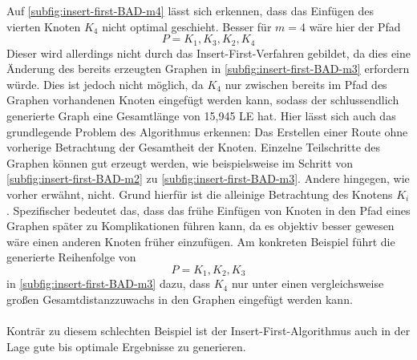 Auf \vref{subfig:insert-first-BAD-m4} lässt sich erkennen, dass das Einfügen des vierten Knoten $K_4$ nicht optimal geschieht. 
Besser für $m = 4$ wäre hier der Pfad 
    $$P=K_1, K_3, K_2, K_4$$
Dieser wird allerdings nicht durch das Insert-First-Verfahren gebildet, da dies eine Änderung des bereits erzeugten Graphen in \vref{subfig:insert-first-BAD-m3} erfordern würde. 
Dies ist jedoch nicht möglich, da $K_4$ nur zwischen bereits im Pfad des Graphen vorhandenen Knoten eingefügt werden kann, sodass der schlussendlich generierte Graph eine Gesamtlänge von 15,945 \ac{LE} hat.
Hier lässt sich auch das grundlegende Problem des Algorithmus erkennen: Das Erstellen einer Route ohne vorherige Betrachtung der Gesamtheit der Knoten. 
Einzelne Teilschritte des Graphen können gut erzeugt werden, wie beispielsweise im Schritt von \vref{subfig:insert-first-BAD-m2} zu \vref{subfig:insert-first-BAD-m3}. 
Andere hingegen, wie vorher erwähnt, nicht. 
Grund hierfür ist die alleinige Betrachtung des Knotens $K_i$. 
Spezifischer bedeutet das, dass das frühe Einfügen von Knoten in den Pfad eines Graphen später zu Komplikationen führen kann, da es objektiv besser gewesen wäre einen anderen Knoten früher einzufügen.
Am konkreten Beispiel führt die generierte Reihenfolge von 
    $$P=K_1, K_2, K_3$$
in \vref{subfig:insert-first-BAD-m3} dazu, dass $K_4$ nur unter einen vergleichsweise großen Gesamtdistanzzuwachs in den Graphen eingefügt werden kann. 
\\\\
Konträr zu diesem schlechten Beispiel ist der Insert-First-Algorithmus auch in der Lage gute bis optimale Ergebnisse zu generieren. 

